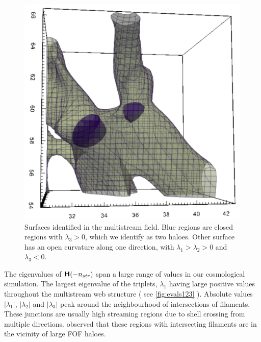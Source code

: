 \documentclass[fleqn,usenatbib,useAMS]{mnras}
\begin{document}
\begin{figure}
\begin{minipage}[t]{.99\linewidth}
  \centering\includegraphics[width=6.cm]{fig9.pdf} 
\end{minipage}\hfill
\caption{Surfaces identified in the multistream field. Blue regions are closed regions with $\lambda_3 > 0 $, which we identify as two haloes. Other surface has an open curvature along one direction, with $\lambda_1 > \lambda_2 > 0$ and $ \lambda_3 < 0$. }
\label{fig:SmallBox}
\end{figure}

The eigenvalues of $\textbf{\textsf{H}}(-n_{str})$ span a large range of values in our cosmological simulation. The largest eigenvalue of the triplets, $\lambda_1$ having large positive values throughout the multistream web structure ( see \autoref{fig:evals123} ). Absolute values $|\lambda_1|$, $|\lambda_2|$ and $|\lambda_3|$ peak around the neighbourhood of intersections of filaments. These junctions are usually high streaming regions due to shell crossing from multiple directions. \cite{Ramachandra2015} observed that these regions with intersecting filaments are in the vicinity of large FOF haloes. 

\end{document}
